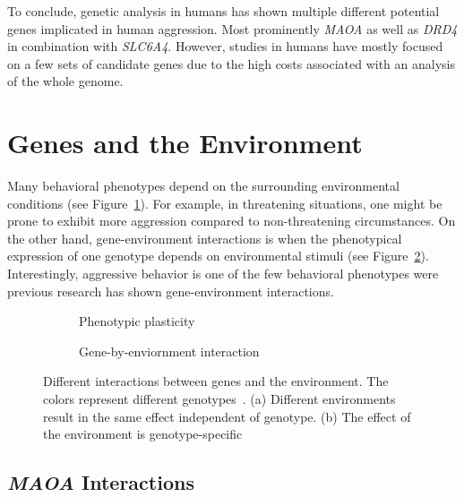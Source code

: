 To conclude, genetic analysis in humans has shown multiple different potential genes implicated in human aggression.
Most prominently \textit{MAOA} as well as \textit{DRD4} in combination with \textit{SLC6A4}.
However, studies in humans have mostly focused on a few sets of candidate genes due to the high costs associated with an analysis of the whole genome.

\section{Genes and the Environment}
\label{sec:gene_environment_interactions}

Many behavioral phenotypes depend on the surrounding environmental conditions (see Figure~\ref{fig:plasticity}).
For example, in threatening situations, one might be prone to exhibit more aggression compared to non-threatening circumstances. 
On the other hand, gene-environment interactions is when the phenotypical expression of one genotype depends on environmental stimuli (see Figure~\ref{fig:gene_env_interaction}).
Interestingly, aggressive behavior is one of the few behavioral phenotypes were previous research has shown gene-environment interactions.

\begin{figure}[!htp]
  \centering
  \begin{subfigure}[t]{0.4\textwidth}
    \centering
    \resizebox{\linewidth}{!}{}
    \caption{Phenotypic plasticity}\label{fig:plasticity}
  \end{subfigure}
  \begin{subfigure}[t]{0.4\textwidth}
    \centering
    \resizebox{\linewidth}{!}{}
    \caption{Gene-by-enviornment interaction}\label{fig:gene_env_interaction}
  \end{subfigure}
  \caption[Gene-Environment Interactions]{Different interactions between genes and the environment. 
    The colors represent different genotypes~\cite{Anholt2012}. 
    (a) Different environments result in the same effect independent of genotype.
    (b) The effect of the environment is genotype-specific}\label{fig:env_interactions}
\end{figure}

\subsection{\textit{MAOA} Interactions}
\label{sub:maoa_interactions}

